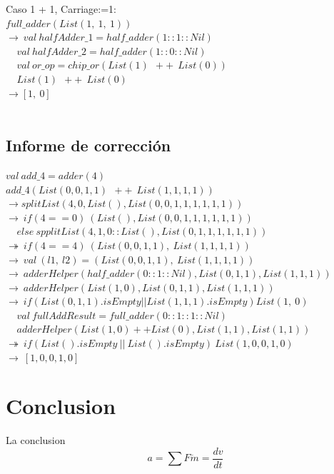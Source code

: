 \documentclass[12pt, a4paper]{article}
\begin{document}
Caso 1 + 1, Carriage:=1:\\
$full\_adder(List(1,~1,~1))$\\
$\rightarrow~val~halfAdder\_1 = half\_adder(1::1::Nil)$ \\
$~~~~~val~halfAdder\_2 = half\_adder(1::0::Nil)$ \\
$~~~~~val~or\_op = chip\_or(List(1)~~++~~List(0))$ \\
$~~~~~List(1)~~++~~List(0)$ \\
$\rightarrow [1,~0]$\\ \\

\subsection{Informe de corrección}

$val ~add\_4 = adder(4)$ \\
$add\_4(List(0,0,1,1)~~++~~List(1, 1, 1, 1))$ \\
$\rightarrow splitList(4, 0, List(), List(0,0,1,1,1,1,1,1))$ \\
$\rightarrow~if(4 == 0) ~(List(), List(0,0,1,1,1,1,1,1))$\\
$~~~~~else~spplitList(4, 1, 0::List(), List(0,1,1,1,1,1,1))$ \\
$\twoheadrightarrow~if(4 == 4) ~(List(0,0,1,1), ~List(1,1,1,1))$\\
$\rightarrow~val~(l1,~l2)=(List(0,0,1,1), ~List(1,1,1,1))$ \\
$\rightarrow~adderHelper( half\_adder(0::1::Nil), List(0,1,1), List(1,1,1) )$ \\
$\rightarrow~adderHelper( List(1,0), List(0,1,1), List(1,1,1) )$ \\
$\rightarrow~if( List(0,1,1).isEmpty || List(1,1,1).isEmpty ) List(1,~0)$ \\
$~~~~~val~fullAddResult = full\_adder(0::1::1::Nil)$ \\
$~~~~~adderHelper( List(1, 0) ++ List(0), List(1,1), List(1,1))$ \\
$\twoheadrightarrow~if(List().isEmpty~||~List().isEmpty) ~List(1,0,0,1,0)$\\
$\rightarrow~[1,0,0,1,0]$
\section{Conclusion}
La conclusion
\newpage{}
\begin{displaymath}
 a = \sum F \dot m = \frac{dv}{dt}
\end{displaymath}
\end{document}
